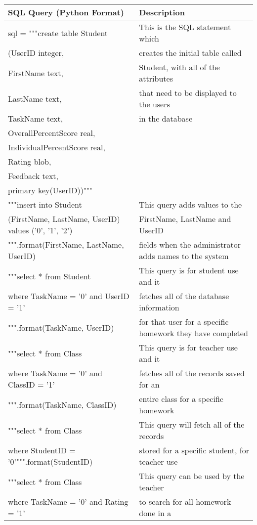 \begin{center}
\begin{tabular}{|p{8cm}|p{6cm}|} \hline
\textbf{SQL Query (Python Format)} & \textbf{Description} \\ \hline
sql = """create table Student & This is the SQL statement which \\ 
(UserID integer, & creates the initial table called \\
FirstName text, & Student, with all of the attributes \\
LastName text, & that need to be displayed to the users \\
TaskName text, & in the database \\
OverallPercentScore real, & \\
IndividualPercentScore real, &\\
Rating blob, & \\
Feedback text, & \\
primary key(UserID))""" & \\ \hline
"""insert into Student & This query adds values to the \\
(FirstName, LastName, UserID) values ('{0}', '{1}', '{2}') & FirstName, LastName and UserID \\
""".format(FirstName, LastName, UserID) & fields when the administrator adds names to the system \\ \hline
"""select * from Student & This query is for student use and it \\
where TaskName = '{0}' and UserID = '{1}' & fetches all of the database information \\
""".format(TaskName, UserID) & for that user for a specific homework they have completed \\ \hline
"""select * from Class & This query is for teacher use and it \\
where TaskName = '{0}' and ClassID = '{1}' & fetches all of the records saved for an\\
""".format(TaskName, ClassID) & entire class for a specific homework \\ \hline
"""select * from Class & This query will fetch all of the records \\
where StudentID = '{0}'""".format(StudentID) & stored for a specific student, for teacher use \\ \hline
"""select * from Class & This query can be used by the teacher \\
where TaskName = '{0}' and Rating = '{1}' & to search for all homework done in a \\

\end{tabular}
\end{center}

